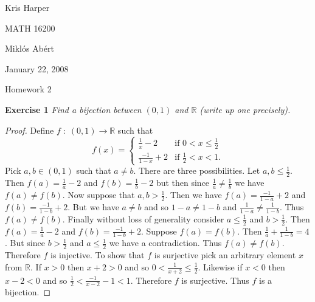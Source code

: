 \documentclass{article}
\begin{document}
\begin{flushright}
Kris Harper

MATH 16200

Mikl\'{o}s Ab\'{e}rt

January 22, 2008
\end{flushright}

\begin{center}
Homework 2
\end{center}

\begin{flushleft}

\textbf{Exercise 1}
\textsl{Find a bijection between $(0,1)$ and $\mathbb{R}$ (write up one precisely).}
\begin{proof}
Define $f \; : \; (0,1) \rightarrow \mathbb{R}$ such that
\[
f(x)=
\begin{cases}
\frac{1}{x}-2 & \text{if } 0 < x \leq \frac{1}{2} \\
\frac{-1}{1-x}+2 & \text{if } \frac{1}{2}<x<1.
\end{cases}
\]
Pick $a,b \in (0,1)$ such that $a \neq b$. There are three possibilities. Let $a,b \leq \frac{1}{2}$. Then $f(a) = \frac{1}{a}-2$ and $f(b) = \frac{1}{b}-2$ but then since $\frac{1}{a} \neq \frac{1}{b}$ we have $f(a) \neq f(b)$. Now suppose that $a,b > \frac{1}{2}$. Then we have $f(a) = \frac{-1}{1-a}+2$ and $f(b) = \frac{-1}{1-b}+2$. But we have $a \neq b$ and so $1-a \neq 1-b$ and $\frac{1}{1-a} \neq \frac{1}{1-b}$. Thus $f(a) \neq f(b)$. Finally without loss of generality consider $a \leq \frac{1}{2}$ and $b > \frac{1}{2}$. Then $f(a) = \frac{1}{a}-2$ and $f(b) = \frac{-1}{1-b}+2$. Suppose $f(a)=f(b)$. Then $\frac{1}{a}+\frac{1}{1-b}=4$. But since $b > \frac{1}{2}$ and $a \leq \frac{1}{2}$ we have a contradiction. Thus $f(a) \neq f(b)$. Therefore $f$ is injective. To show that $f$ is surjective pick an arbitrary element $x$ from $\mathbb{R}$. If $x>0$ then $x+2>0$ and so $0<\frac{1}{x+2} \leq \frac{1}{2}$. Likewise if $x<0$ then $x-2<0$ and so $\frac{1}{2} < \frac{-1}{x-2}-1 < 1$. Therefore $f$ is surjective. Thus $f$ is a bijection.
\end{proof}


\end{flushleft}
\end{document}
